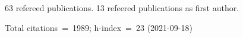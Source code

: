 63 refereed publications. 13 refeered publications as first author.

Total citations~=~1989; h-index~=~23 (2021-09-18)